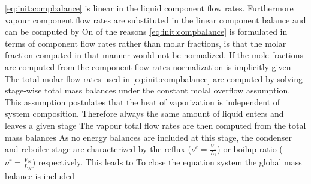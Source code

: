         \eqref{eq:init:compbalance} is linear in the liquid component flow rates. Furthermore vapour component
        flow rates are substituted in the linear component balance and can be computed by
        On of the reasons \eqref{eq:init:compbalance} is formulated in terms of component flow rates rather
        than molar fractions, is that the molar fraction computed in that manner would not be normalized. If
        the mole fractions are computed from the component flow rates normalization is implicitly given
        The total molar flow rates used in \eqref{eq:init:compbalance} are computed by solving
        stage-wise total mass balances under the constant molal overflow assumption. This assumption
        postulates that the heat of vaporization is independent of system composition.
        Therefore always the same amount of liquid enters and leaves a given stage
        The vapour total flow rates are then computed from the total mass balances
        As no energy balances are included at this stage, the condenser and reboiler stage
        are characterized by the reflux ($\nu^c = \frac{V_1}{L_1}$) or boilup ratio
        ($\nu^r = \frac{V_N}{L_N}$) respectively. This leads to
        To close the equation system the global mass balance is included
